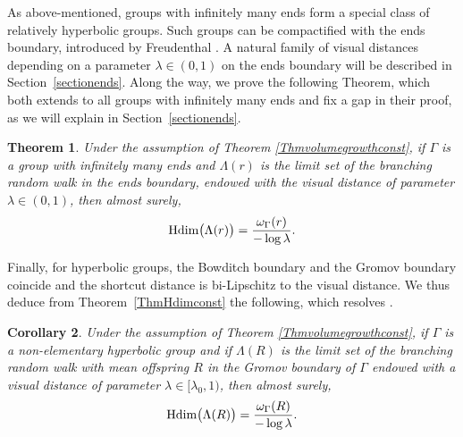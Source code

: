 \documentclass{amsart}
\newcommand{\showcomments}{yes}
\newenvironment{comment}%
{\ifthenelse{\equal{\showcomments}{yes}}%
{\footnotemark
    \begin{lrbox}{\commentbox}
    \begin{minipage}[t]{1.25in}\raggedright\sffamily\upshape\tiny
    \footnotemark[\arabic{footnote}]}%
{\begin{lrbox}{\commentbox}}}%
{\ifthenelse{\equal{\showcomments}{yes}}%
{\end{minipage}\end{lrbox}\marginpar{\usebox{\commentbox}}}%
{\end{lrbox}}}
\newtheorem{thm}{Theorem}[section]
\newtheorem{cor}[thm]{Corollary}
\theoremstyle{definition}
\theoremstyle{remark}
\newcommand{\Hdim}{{\rm Hdim}}
\begin{document}
 
As above-mentioned, groups with infinitely many ends form a special class of relatively hyperbolic groups.
Such groups can be compactified with the ends boundary, introduced by Freudenthal \cite{Freudenthal}. A natural family of visual distances depending on a parameter $\lambda\in(0,1)$ on the ends boundary      will be described in Section~\ref{sectionends}.
Along the way, we prove the following Theorem, which both extends  \cite[Theorem~3.5]{CandelleroGilchMuller} to all groups with infinitely many ends and fix a gap in their proof, as we will explain in Section~\ref{sectionends}.
\begin{thm}\label{coroaccessiblegroups}
Under the assumption of Theorem \ref{Thmvolumegrowthconst}, if $\Gamma$ is  a group with infinitely many ends  and $\Lambda(r)$ is the   limit set of the branching random walk in the ends boundary, endowed with the visual distance of parameter $\lambda\in (0,1)$, then almost surely,
$$\Hdim\big(\Lambda(r)\big)=\frac{\omega_\Gamma(r)}{-\log \lambda}.$$  
\end{thm}


Finally, for hyperbolic groups, the Bowditch boundary and the Gromov boundary coincide and the shortcut distance is bi-Lipschitz to the visual distance.
We thus deduce from Theorem~\ref{ThmHdimconst} the following, which  resolves \cite[Conjecture 1.4]{SWX}.
\begin{cor}\label{corohausdorffdimensionhyperbolic}
Under the assumption of Theorem \ref{Thmvolumegrowthconst}, if   $\Gamma$ is a non-elementary hyperbolic group and if $\Lambda(R)$ is the limit set of the branching random walk with mean offspring $R$ in the Gromov boundary of $\Gamma$ endowed with a visual distance of parameter $\lambda\in [\lambda_0,1)$,
then almost surely,
$$\Hdim\big(\Lambda(R)\big)=\frac{\omega_\Gamma(R)}{-\log \lambda}.$$
\end{cor}
\end{document}
